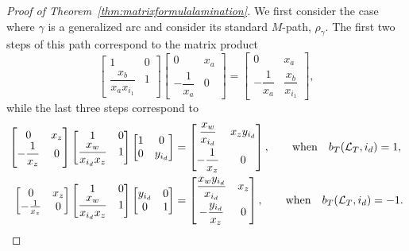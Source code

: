 \documentclass[pdftex]{sigma}
\numberwithin{equation}{section}
\theoremstyle{definition}
\begin{document}
\begin{proof}[Proof of Theorem~\ref{thm:matrixformulalamination}]
 We first consider the case where $\gamma$ is a generalized arc and consider its standard $M$-path, $\rho_{\gamma}$. The first two steps of this path correspond to the matrix product
 \[\begin{bmatrix}
 1 & 0\\
 \dfrac{x_b}{x_a x_{i_1}} & 1
 \end{bmatrix}
 \begin{bmatrix}
 0 & x_a\\
 -\dfrac{1}{x_a} & 0
 \end{bmatrix}=
 \begin{bmatrix}
 0 & x_a\\
 -\dfrac{1}{x_a} & \dfrac{x_b}{x_{i_1}}
 \end{bmatrix},\]
 while the last three steps correspond to
\begin{align*}
\begin{bmatrix}
 0 & x_z\\
 -\dfrac{1}{x_z} & 0
 \end{bmatrix}
 \begin{bmatrix}
 1 & 0\\
 \dfrac{x_w}{x_{i_d} x_z} & 1
 \end{bmatrix}
 \begin{bmatrix}
 1 & 0\\
 0 & y_{i_d}
 \end{bmatrix}&=
 \begin{bmatrix}
 \dfrac{x_w}{x_{i_d}} & x_z y_{i_d}\vspace{1mm}\\
 -\dfrac{1}{x_z} & 0
 \end{bmatrix}, \qquad\text{when}\quad b_T(\mathcal{L}_T, i_d)=1,\\
\begin{bmatrix}
 0 & x_z\\
 -\frac{1}{x_z} & 0
 \end{bmatrix}
 \begin{bmatrix}
 1 & 0\\
 \dfrac{x_w}{x_{i_d} x_z} & 1
 \end{bmatrix}
 \begin{bmatrix}
 y_{i_d} & 0\\
 0 & 1
 \end{bmatrix}&=
 \begin{bmatrix}
 \dfrac{x_w y_{i_d}}{x_{i_d}} & x_z\vspace{1mm}\\
 -\dfrac{y_{i_d}}{x_z} & 0
 \end{bmatrix},\qquad \text{when}\quad b_T(\mathcal{L}_T, i_d)=-1.
\end{align*}


\end{proof}
\end{document}
